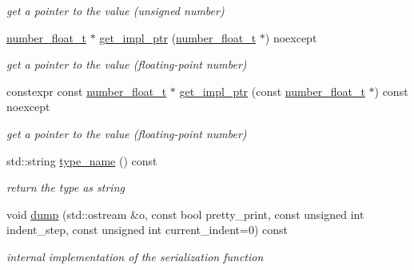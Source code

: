 \begin{DoxyCompactItemize}
\begin{DoxyCompactList}\small\item\em get a pointer to the value (unsigned number) \end{DoxyCompactList}\item 
\hypertarget{classnlohmann_1_1basic__json_a4044d27206221c274a25cc91e86e02a6}{}\label{classnlohmann_1_1basic__json_a4044d27206221c274a25cc91e86e02a6} 
\hyperlink{classnlohmann_1_1basic__json_a74a0013e847fdc574b48f931f0e757e1}{number\+\_\+float\+\_\+t} $\ast$ \hyperlink{classnlohmann_1_1basic__json_a4044d27206221c274a25cc91e86e02a6}{get\+\_\+impl\+\_\+ptr} (\hyperlink{classnlohmann_1_1basic__json_a74a0013e847fdc574b48f931f0e757e1}{number\+\_\+float\+\_\+t} $\ast$) noexcept
\begin{DoxyCompactList}\small\item\em get a pointer to the value (floating-\/point number) \end{DoxyCompactList}\item 
\hypertarget{classnlohmann_1_1basic__json_a5dee8716266acee794ba5320f8453af9}{}\label{classnlohmann_1_1basic__json_a5dee8716266acee794ba5320f8453af9} 
constexpr const \hyperlink{classnlohmann_1_1basic__json_a74a0013e847fdc574b48f931f0e757e1}{number\+\_\+float\+\_\+t} $\ast$ \hyperlink{classnlohmann_1_1basic__json_a5dee8716266acee794ba5320f8453af9}{get\+\_\+impl\+\_\+ptr} (const \hyperlink{classnlohmann_1_1basic__json_a74a0013e847fdc574b48f931f0e757e1}{number\+\_\+float\+\_\+t} $\ast$) const noexcept
\begin{DoxyCompactList}\small\item\em get a pointer to the value (floating-\/point number) \end{DoxyCompactList}\item 
std\+::string \hyperlink{classnlohmann_1_1basic__json_a4afa0c4179a63e19975975a36ebbb9c2}{type\+\_\+name} () const
\begin{DoxyCompactList}\small\item\em return the type as string \end{DoxyCompactList}\item 
void \hyperlink{classnlohmann_1_1basic__json_a7ca7e132c3641f440fea36892fc694cf}{dump} (std\+::ostream \&o, const bool pretty\+\_\+print, const unsigned int indent\+\_\+step, const unsigned int current\+\_\+indent=0) const
\begin{DoxyCompactList}\small\item\em internal implementation of the serialization function \end{DoxyCompactList}\end{DoxyCompactItemize}
